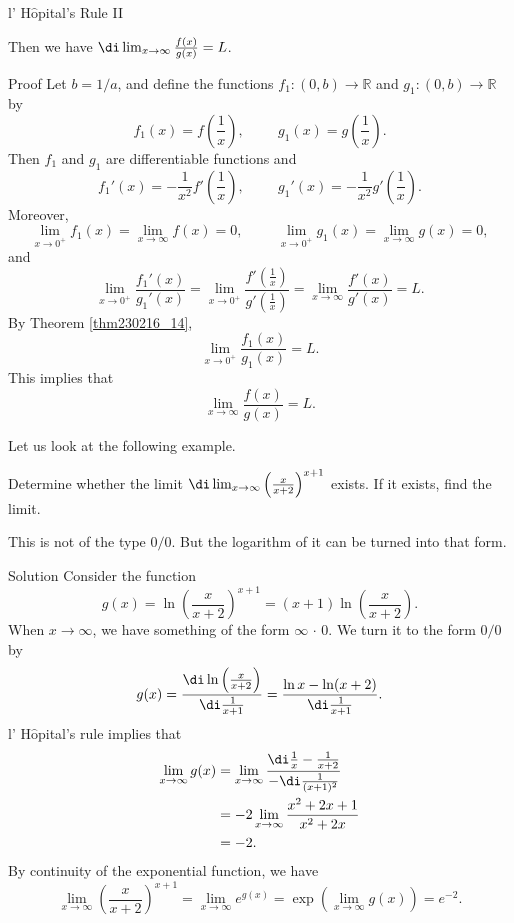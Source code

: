 \begin{example}{}
\begin{theorem}[label=thm230216_18]{l' H$\hat{\text{o}}$pital's Rule II}
\begin{enumerate}[(i)]
\end{enumerate}
Then  we have $\di \lim_{x\rightarrow \infty}\frac{f(x)}{g(x)}=L$.
\end{theorem}
\begin{myproof}{Proof}
Let $b=1/a$, and define the functions $f_1:(0, b)\to\mathbb{R}$ and $g_1:(0,b)\to\mathbb{R}$ by
\[f_1(x)=f\left(\frac{1}{x}\right),\hspace{1cm}g_1(x)=g\left(\frac{1}{x}\right).\]  Then $f_1$ and $g_1$ are differentiable functions and
\[f_1'(x)=-\frac{1}{x^2}f'\left(\frac{1}{x}\right),\hspace{1cm}g_1'(x)=-\frac{1}{x^2}g'\left(\frac{1}{x}\right).\]
Moreover,
\[\lim_{x\to 0^+}f_1(x)=\lim_{x\to\infty}f(x)=0,\hspace{1cm}\lim_{x\to 0^+}g_1(x)=\lim_{x\to\infty}g(x)=0,\]
and
\[\lim_{x\to 0^+}\frac{f_1'(x)}{g_1'(x)}=\lim_{x\to 0^+}\frac{f'\left(\frac{1}{x}\right)}{g'\left(\frac{1}{x}\right)}=\lim_{x\to\infty}\frac{f'(x)}{g'(x)}=L.\]
By Theorem \ref{thm230216_14}, 
\[\lim_{x\to 0^+}\frac{f_1(x)}{g_1 (x)}=L.\]This implies that 
\[ \lim_{x\rightarrow \infty}\frac{f(x)}{g(x)}=L.\]
\end{myproof}

 Let us look at the following example.
\begin{example}{}
Determine whether the limit $\di\lim_{x\to \infty}\left(\frac{x}{x+2}\right)^{x+1}$ exists. If it exists, find the limit.
\end{example}
This is not of the type $0/0$. But the logarithm of it can be turned into that form.
\begin{solution}{Solution}
Consider the function 
\[g(x)=\ln \left(\frac{x}{x+2}\right)^{x+1}=(x+1)\ln \left(\frac{x}{x+2}\right).\]
When $x\to \infty$, we have something of the form $\infty \,\cdot\,0$. We turn it to the form $0/0$ by
\[g(x)=\frac{\di \ln\left(\frac{x}{x+2}\right)}{\di \frac{1}{x+1}}=\frac{\ln x-\ln(x+2)}{\di \frac{1}{x+1}}.\]
 l' H$\hat{\text{o}}$pital's rule implies that
\begin{align*}\lim_{x\to\infty}g(x)&=\lim_{x\to\infty}\frac{\di\frac{1}{x}-\frac{1}{x+2}}{-\di \frac{1}{(x+1)^2}}\\
&=-2\lim_{x\to \infty}\frac{x^2+2x+1}{x^2+2x}\\
&=-2.
\end{align*}
By continuity of the exponential function, we have
\[\lim_{x\to \infty}\left(\frac{x}{x+2}\right)^{x+1}=\lim_{x\to \infty}e^{g(x)}=\exp\left(\lim_{x\to \infty}g(x)\right)=e^{-2}.\]
\end{solution}



\end{example}
